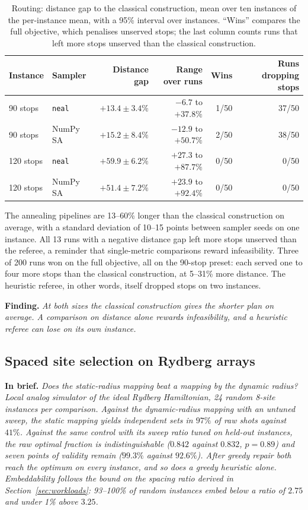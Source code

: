 \documentclass[11pt,a4paper]{article}
\newcommand{\finding}[1]{\par\smallskip\noindent\textbf{Finding.} \emph{#1}\par\smallskip}
\newcommand{\inbrief}[1]{\par\smallskip\noindent\textbf{In brief.} \emph{#1}\par\medskip}
\begin{document}
\begin{table}[H]
\centering\small
\begin{tabular}{llrrrr}
\toprule
Instance & Sampler & Distance gap & Range over runs & Wins & Runs dropping stops \\
\midrule
90 stops & \texttt{neal} & $+13.4 \pm 3.4\%$ & $-6.7$ to $+37.8\%$ & 1/50 & 37/50 \\
90 stops & NumPy SA & $+15.2 \pm 8.4\%$ & $-12.9$ to $+50.7\%$ & 2/50 & 38/50 \\
120 stops & \texttt{neal} & $+59.9 \pm 6.2\%$ & $+27.3$ to $+87.7\%$ & 0/50 & 0/50 \\
120 stops & NumPy SA & $+51.4 \pm 7.2\%$ & $+23.9$ to $+92.4\%$ & 0/50 & 0/50 \\
\bottomrule
\end{tabular}
\caption{Routing: distance gap to the classical construction, mean over ten
instances of the per-instance mean, with a 95\% interval over instances.
``Wins'' compares the full objective, which penalises unserved stops; the
last column counts runs that left more stops unserved than the classical
construction.}
\label{tab:fleet}
\end{table}

The annealing pipelines are 13--60\% longer than the classical construction
on average, with a standard deviation of 10--15 points between sampler seeds
on one instance. All 13 runs with a negative distance gap left more stops
unserved than the referee,
a reminder that single-metric comparisons reward infeasibility.
Three of 200 runs won on the full objective, all on the 90-stop preset: each
served one to four more stops than the classical construction, at 5--31\%
more distance. The heuristic referee, in other words, itself dropped stops
on two instances.

\finding{At both sizes the classical construction gives the shorter plan on
average. A comparison on distance alone rewards infeasibility, and a
heuristic referee can lose on its own instance.}

\subsection{Spaced site selection on Rydberg arrays}
\label{sec:res-mis}

\inbrief{Does the static-radius mapping beat a mapping by the dynamic
radius? Local analog simulator of the ideal Rydberg Hamiltonian,
24 random 8-site instances per comparison. Against the dynamic-radius
mapping with an untuned sweep, the static mapping yields independent sets in $97\%$ of raw shots
against $41\%$. Against the same control with its sweep ratio tuned on
held-out instances, the raw optimal fraction is indistinguishable ($0.842$
against $0.832$, $p = 0.89$) and seven points of validity remain ($99.3\%$
against $92.6\%$). After greedy repair both reach the optimum on every
instance, and so does a greedy heuristic alone. Embeddability follows the
bound on the spacing ratio derived in Section~\ref{sec:workloads}: 93--100\%
of random instances embed below a ratio of $2.75$ and under 1\% above
$3.25$.}
\end{document}
